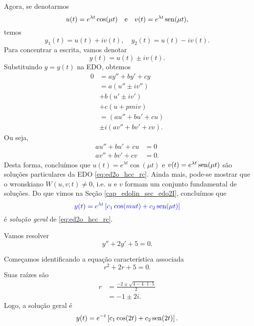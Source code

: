 Agora, se denotarmos
\begin{equation}
  u(t) = e^{\lambda t}\cos(\mu t)\quad\text{e}\quad v(t) = e^{\lambda t}\operatorname{sen}(\mu t),
\end{equation}
temos
\begin{equation}
  y_1(t) = u(t) + iv(t),\quad y_2(t) = u(t) - iv(t).
\end{equation}
Para concentrar a escrita, vamos denotar
\begin{equation}
  y(t) = u(t) \pm iv(t).
\end{equation}
Substituindo $y = y(t)$ na EDO, obtemos
\begin{align}
  0 &= ay'' + by' + cy \\
    &= a(u'' \pm iv'') \\
    &+ b(u' \pm iv') \\
    &+ c(u + pm iv) \\
    &= (au'' + bu' + cu) \\
    &\pm i(av'' + bv' + cv).
\end{align}
Ou seja,
\begin{align}
  au'' + bu' + cu &= 0 \\
  av'' + bv' + cv &= 0.
\end{align}
Desta forma, concluímos que $u(t) = e^{\lambda t}\cos(\mu t)$ e $v(t) = e^{\lambda t}\operatorname{sen}(\mu t)$ são soluções particulares da EDO \eqref{eq:ed2o_hcc_rc}. Ainda mais, pode-se mostrar que o wronskiano $W(u,v;t)\neq 0$, i.e. $u$ e $v$ formam um conjunto fundamental de soluções. Do que vimos na Seção \ref{cap_edolin_sec_edo2I}, concluímos que
\begin{equation}
  {\color{blue}y(t) = e^{\lambda t}\left[c_1\cos(mu t) + c_2\operatorname{sen}(\mu t)\right]}
\end{equation}
é \emph{solução geral} de \eqref{eq:ed2o_hcc_rc}.

\begin{ex}
  Vamos resolver
  \begin{equation}
    y'' + 2y' + 5 = 0.
  \end{equation}

  Começamos identificando a equação característica associada
  \begin{equation}
    r^2 + 2r + 5 = 0.
  \end{equation}
  Suas raízes são
  \begin{align}
    r &= \frac{-2 \pm \sqrt{4 - 4\cdot 1\cdot 5}}{2} \\
      &= -1 \pm 2i.
  \end{align}
  Logo, a solução geral é
  \begin{equation}
    y(t) = e^{-t}\left[c_1\cos(2t) + c_2\operatorname{sen}(2t)\right].
  \end{equation}
\end{ex}

